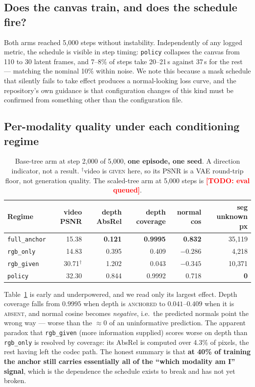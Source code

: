 \documentclass{article}
\newcommand{\TODO}[1]{\textcolor{red}{\textbf{[TODO: #1]}}}
\begin{document}
\subsection{Does the canvas train, and does the schedule fire?}

Both arms reached 5{,}000 steps without instability. Independently of any logged metric, the
schedule is visible in step timing: \texttt{policy} collapses the canvas from 110 to 30 latent
frames, and 7--8\% of steps take 20--21\,s against 37\,s for the rest --- matching the nominal
10\% within noise. We note this because a mask schedule that silently fails to take effect
produces a normal-looking loss curve, and the repository's own guidance is that configuration
changes of this kind must be confirmed from something other than the configuration file.

\subsection{Per-modality quality under each conditioning regime}

\begin{table}[t]
\centering
\small
\begin{tabular}{lrrrrr}
\toprule
Regime & video PSNR & depth AbsRel & depth coverage & normal cos & seg unknown px \\
\midrule
\texttt{full\_anchor} & 15.38 & \textbf{0.121} & \textbf{0.9995} & \textbf{0.832} & 35{,}119 \\
\texttt{rgb\_only}    & 14.83 & 0.395 & 0.409 & $-0.286$ & 4{,}218 \\
\texttt{rgb\_given}   & 30.71$^\dagger$ & 1.202 & 0.043 & $-0.345$ & 10{,}371 \\
\texttt{policy}       & 32.30 & 0.844 & 0.9992 & 0.718 & \textbf{0} \\
\bottomrule
\end{tabular}
\caption{Base-tree arm at step 2{,}000 of 5{,}000, \textbf{one episode, one seed}. A direction
indicator, not a result. $^\dagger$video is \textsc{given} here, so its PSNR is a VAE round-trip
floor, not generation quality. The scaled-tree arm at 5{,}000 steps is \TODO{eval queued}.}
\label{tab:regimes}
\end{table}

Table~\ref{tab:regimes} is early and underpowered, and we read only its largest effect. Depth
coverage falls from $0.9995$ when depth is \textsc{anchored} to $0.041$--$0.409$ when it is
\textsc{absent}, and normal cosine becomes \emph{negative}, i.e.\ the predicted normals point the
wrong way --- worse than the $\approx 0$ of an uninformative prediction. The apparent paradox that
\texttt{rgb\_given} (more information supplied) scores worse on depth than \texttt{rgb\_only} is
resolved by coverage: its AbsRel is computed over 4.3\% of pixels, the rest having left the codec
path. The honest summary is that \textbf{at 40\% of training the anchor still carries essentially
all of the ``which modality am I'' signal}, which is the dependence the schedule exists to break
and has not yet broken.
\end{document}
